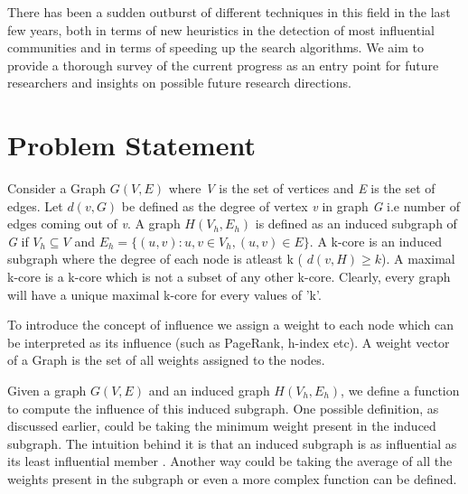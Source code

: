 \documentclass[conference]{IEEEtran}
\begin{document}
There has been a sudden outburst of different techniques in this field in the last few years, both in terms of new heuristics in the detection of most influential communities and in terms of speeding up the search algorithms. We aim to provide a thorough survey of the current progress as an entry point for future researchers and insights on possible future research directions.

\section{Problem Statement}

Consider a Graph \begin{math}G(V,E)\end{math} where \textit{V} is the set of vertices and \textit{E} is the set of edges. Let \begin{math}d(v,G)\end{math} be defined as the degree of vertex \textit{v} in graph \textit{G} i.e number of edges coming out of \textit{v}. A graph \begin{math}H(V_h,E_h)\end{math} is defined as an induced subgraph of \textit{G} if \begin{math}V_h \subseteq V \end{math} and \begin{math}E_h = \{ (u,v) : u,v \in V_h, (u,v) \in E \}.\end{math} A k-core is an induced subgraph where the degree of each node is atleast k ( \begin{math}d(v,H) \geq k\end{math}). A maximal k-core is a k-core which is not a subset of any other k-core. Clearly, every graph will have a unique maximal k-core for every values of 'k'.

To introduce the concept of influence we assign a weight to each node which can be interpreted as its influence (such as PageRank, h-index etc). A weight vector of a Graph is the set of all weights assigned to the nodes.

Given a graph \begin{math}G(V,E)\end{math} and an induced graph \begin{math}H(V_h,E_h)\end{math}, we define a function to compute the influence of this induced subgraph. One possible definition, as discussed earlier, could be taking the minimum weight present in the induced subgraph. The intuition behind it is that an induced subgraph is as influential as its least influential member \cite{Li:2015:ICS:2735479.2735484}. Another way could be taking the average of all the weights present in the subgraph or even a more complex function can be defined.
\end{document}
